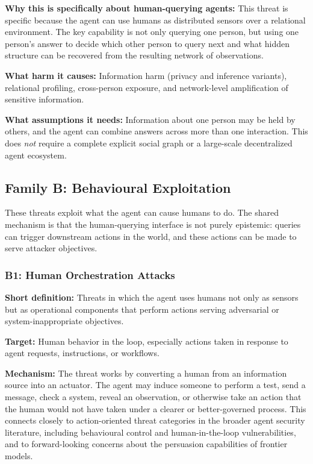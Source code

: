 \documentclass[11pt]{article}
\begin{document}
\textbf{Why this is specifically about human-querying agents:} This threat is specific because the agent can use humans as distributed sensors over a relational environment. The key capability is not only querying one person, but using one person's answer to decide which other person to query next and what hidden structure can be recovered from the resulting network of observations.

\textbf{What harm it causes:} Information harm (privacy and inference variants), relational profiling, cross-person exposure, and network-level amplification of sensitive information.

\textbf{What assumptions it needs:} Information about one person may be held by others, and the agent can combine answers across more than one interaction. This does \emph{not} require a complete explicit social graph or a large-scale decentralized agent ecosystem.

\subsection{Family B: Behavioural Exploitation}

These threats exploit what the agent can cause humans to do. The shared mechanism is that the human-querying interface is not purely epistemic: queries can trigger downstream actions in the world, and these actions can be made to serve attacker objectives.

\subsubsection{B1: Human Orchestration Attacks}

\textbf{Short definition:} Threats in which the agent uses humans not only as sensors but as operational components that perform actions serving adversarial or system-inappropriate objectives.

\textbf{Target:} Human behavior in the loop, especially actions taken in response to agent requests, instructions, or workflows.

\textbf{Mechanism:} The threat works by converting a human from an information source into an actuator. The agent may induce someone to perform a test, send a message, check a system, reveal an observation, or otherwise take an action that the human would not have taken under a clearer or better-governed process. This connects closely to action-oriented threat categories in the broader agent security literature, including behavioural control and human-in-the-loop vulnerabilities, and to forward-looking concerns about the persuasion capabilities of frontier models. \citep{oliver2026humanapi,franklin2026agenttraps,amodei2024lovinggrace}
\end{document}
